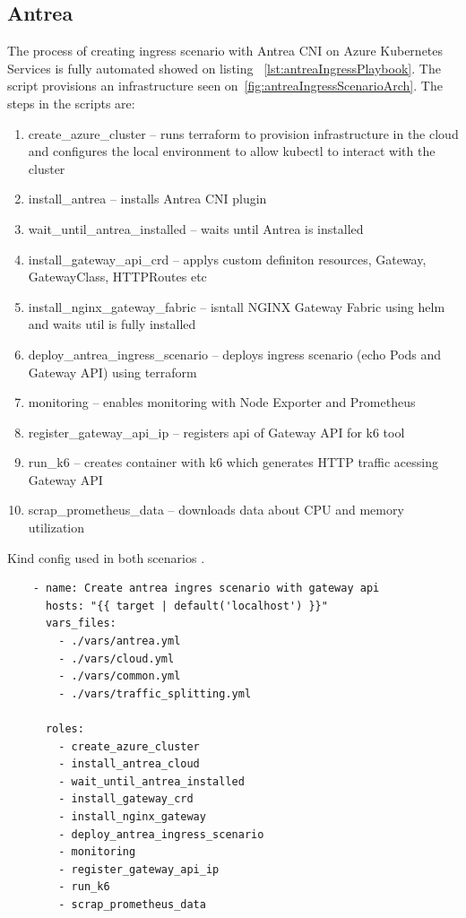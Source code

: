 \subsection{Antrea}
\label{sec:antreaIngressImpl}

The process of creating ingress scenario with Antrea CNI on Azure Kubernetes Services is fully automated showed on listing ~\ref{lst:antreaIngressPlaybook}. The script provisions an infrastructure seen on~\ref{fig:antreaIngressScenarioArch}. The steps in the scripts are: 


\begin{enumerate}
  \item create\_azure\_cluster -- runs terraform to provision infrastructure in the cloud and configures the local environment to allow kubectl to interact with the cluster
  \item install\_antrea -- installs Antrea CNI plugin
  \item wait\_until\_antrea\_installed -- waits until Antrea is installed
  \item install\_gateway\_api\_crd -- applys custom definiton resources, Gateway, GatewayClass, HTTPRoutes etc
  \item install\_nginx\_gateway\_fabric -- isntall NGINX Gateway Fabric using helm and waits util is fully installed
  \item deploy\_antrea\_ingress\_scenario -- deploys ingress scenario (echo Pods and Gateway API) using terraform
  \item monitoring -- enables monitoring with Node Exporter and Prometheus
  \item register\_gateway\_api\_ip -- registers api of Gateway API for k6 tool
  \item run\_k6 -- creates container with k6 which generates HTTP traffic acessing Gateway API
  \item scrap\_prometheus\_data -- downloads data about CPU and memory utilization
\end{enumerate}

\begin{listing}[H]
  \centering
  \caption{Kind config used in both scenarios \cite{KindConfig}.}
  \begin{verbatim}
    - name: Create antrea ingres scenario with gateway api
      hosts: "{{ target | default('localhost') }}"
      vars_files:
        - ./vars/antrea.yml
        - ./vars/cloud.yml
        - ./vars/common.yml
        - ./vars/traffic_splitting.yml

      roles:
        - create_azure_cluster
        - install_antrea_cloud
        - wait_until_antrea_installed
        - install_gateway_crd
        - install_nginx_gateway
        - deploy_antrea_ingress_scenario
        - monitoring
        - register_gateway_api_ip
        - run_k6
        - scrap_prometheus_data
  \end{verbatim}
  \label{lst:antreaIngressPlaybook}
\end{listing}


